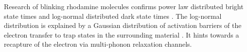 		Research of blinking rhodamine molecules confirms power law distributed bright state times and log-normal distributed dark state times \cite{Wong2013}.
		The log-normal distribution is explained by a Gaussian distribution of activation barriers of the electron transfer to trap states in the surrounding material \cite{Albery1985}.
		It hints towards a recapture of the electron via multi-phonon relaxation channels.
